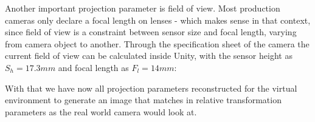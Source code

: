 Another important projection parameter is field of view. Most production 
cameras only declare a focal length on lenses - which makes sense in that 
context, since field of view is a constraint between sensor size and focal 
length, varying from camera object to another. Through the specification sheet 
of the camera the current field of view can be calculated inside Unity, with 
the sensor height as $S_h = 17.3mm$ and focal length as $F_l = 14mm$:



With that we have now all projection parameters reconstructed for the virtual 
environment to generate an image that matches in relative transformation 
parameters as the real world camera would look at.